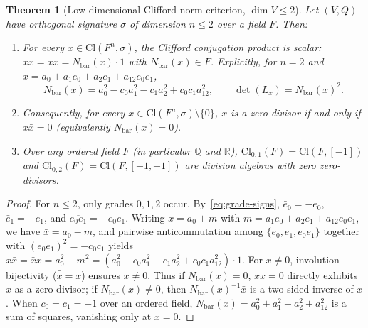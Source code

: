 \documentclass[11pt]{article}
\newtheorem{theorem}{Theorem}[section]
\theoremstyle{definition}
\newcommand{\Cl}{\mathrm{Cl}}
\newcommand{\Nbar}{N_{\mathrm{bar}}}
\begin{document}
\begin{theorem}[Low-dimensional Clifford norm criterion, $\dim V \le 2$]
\label{thm:dim2}
Let $(V, Q)$ have orthogonal signature $\sigma$ of dimension $n \le 2$ over a
field $F$. Then:
\begin{enumerate}
  \item For every $x \in \Cl(F^n, \sigma)$, the Clifford conjugation product is
    scalar: $x\bar{x} = \bar{x}x = \Nbar(x)\cdot 1$ with $\Nbar(x) \in F$. Explicitly,
    for $n = 2$ and $x = a_0 + a_1 e_0 + a_2 e_1 + a_{12} e_0 e_1$,
    \[
      \Nbar(x) = a_0^2 - c_0 a_1^2 - c_1 a_2^2 + c_0 c_1 a_{12}^2, \qquad
      \det(L_x) = \Nbar(x)^2.
    \]
  \item Consequently, for every $x \in \Cl(F^n, \sigma) \setminus \{0\}$,
    $x$ is a zero divisor if and only if $x\bar{x} = 0$ (equivalently $\Nbar(x) = 0$).
  \item Over any ordered field $F$ (in particular $\mathbb{Q}$ and $\mathbb{R}$),
    $\Cl_{0,1}(F) = \Cl(F, [-1])$ and $\Cl_{0,2}(F) = \Cl(F, [-1, -1])$ are
    division algebras with zero zero-divisors.
\end{enumerate}
\end{theorem}
\begin{proof}
For $n \le 2$, only grades $0, 1, 2$ occur. By~\eqref{eq:grade-signs},
$\bar{e}_0 = -e_0$, $\bar{e}_1 = -e_1$, and $\overline{e_0 e_1} = -e_0 e_1$.
Writing $x = a_0 + m$ with $m = a_1 e_0 + a_2 e_1 + a_{12} e_0 e_1$, we have
$\bar{x} = a_0 - m$, and pairwise anticommutation among $\{e_0, e_1, e_0 e_1\}$
together with $(e_0 e_1)^2 = -c_0 c_1$ yields
$x\bar{x} = \bar{x}x = a_0^2 - m^2 = (a_0^2 - c_0 a_1^2 - c_1 a_2^2 + c_0 c_1 a_{12}^2)\cdot 1$.
For $x \neq 0$, involution bijectivity ($\bar{\bar{x}} = x$) ensures $\bar{x} \neq 0$.
Thus if $\Nbar(x) = 0$, $x\bar{x} = 0$ directly exhibits $x$ as a zero divisor;
if $\Nbar(x) \neq 0$, then $\Nbar(x)^{-1}\bar{x}$ is a two-sided inverse of $x$.
When $c_0 = c_1 = -1$ over an ordered field, $\Nbar(x) = a_0^2 + a_1^2 + a_2^2 + a_{12}^2$
is a sum of squares, vanishing only at $x = 0$.
\end{proof}
\end{document}
